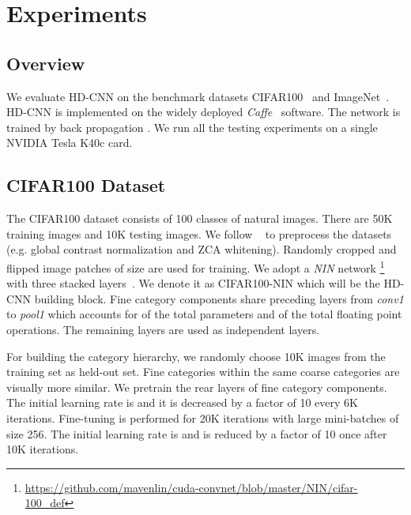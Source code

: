 \documentclass[10pt,twocolumn,letterpaper]{article}
\begin{document}
\section{Experiments}
\label{sec:experiments}

\subsection{Overview}
We evaluate HD-CNN on the benchmark datasets  CIFAR100~\cite{krizhevsky2009learning} and ImageNet~\cite{deng2009imagenet}. HD-CNN is implemented on the widely deployed \textit{Caffe}~\cite{Jia13caffe} software. The network is trained by back propagation \cite{krizhevsky2012imagenet}. We run all the testing experiments on a single NVIDIA Tesla K40c card.


























\subsection{CIFAR100 Dataset}
\label{sec:cifar100_nin}
The CIFAR100 dataset consists of 100 classes of natural images. There are 50K training images and 10K testing images. We follow ~\cite{goodfellow2013maxout} to preprocess the datasets (e.g. global contrast normalization and ZCA whitening). Randomly cropped and flipped image patches of size  are used for training. We adopt a \textit{NIN} network \footnote{\url{https://github.com/mavenlin/cuda-convnet/blob/master/NIN/cifar-100_def}} with three stacked layers~\cite{LinCY13}. 
We denote it as CIFAR100-NIN which will be the HD-CNN building block. Fine category components share preceding layers from \textit{conv1} to \textit{pool1} which accounts for  of the total parameters and  of the total floating point operations. The remaining layers are used as independent layers.


For building the category hierarchy, we randomly choose 10K images from the training set as  held-out set. Fine categories within the same coarse categories are visually more similar. We pretrain the rear layers of fine category components. The initial learning rate is  and it is decreased by a factor of 10 every 6K iterations. Fine-tuning is performed for 20K iterations with large mini-batches of size 256. The initial learning rate is  and is reduced by a factor of 10 once after 10K iterations.
\end{document}

